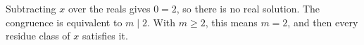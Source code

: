 Subtracting $x$ over the reals gives $0=2$, so there is no real solution. The congruence is equivalent to $m\mid2$. With $m\ge2$, this means $\boxed{m=2}$, and then every residue class of $x$ satisfies it.
